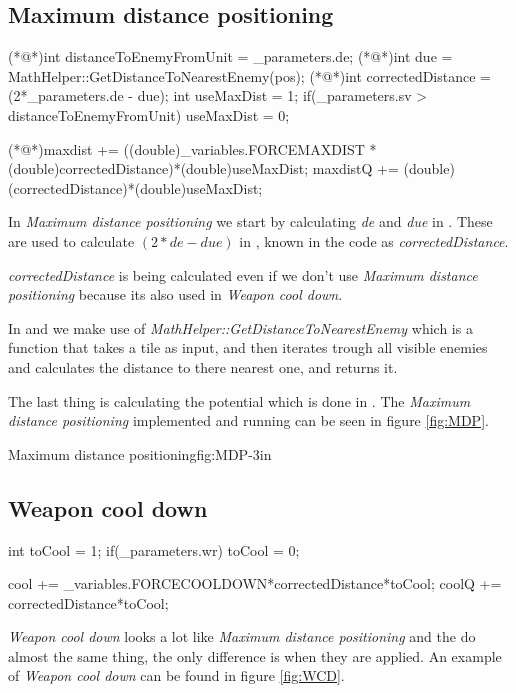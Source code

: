 	\subsection{Maximum distance positioning}
		\begin{Sourcecode}[caption=Maximum distance]
(*@\lnote@*)int distanceToEnemyFromUnit = _parameters.de;
(*@\lnote@*)int due = MathHelper::GetDistanceToNearestEnemy(pos);
(*@\lnote@*)int correctedDistance = (2*_parameters.de - due);
int useMaxDist = 1;
if(_parameters.sv > distanceToEnemyFromUnit)
	useMaxDist = 0;

(*@\lnote@*)maxdist += ((double)_variables.FORCEMAXDIST * (double)correctedDistance)*(double)useMaxDist;
maxdistQ += (double)(correctedDistance)*(double)useMaxDist;
\end{Sourcecode}
	
	In \textit{Maximum distance positioning} we start by calculating \textit{de} and \textit{due }in  . These are used to calculate $(2*de - due)$ in , known in the code as \textit{correctedDistance}. 
	
	\textit{correctedDistance} is being calculated even if we don't use \textit{Maximum distance positioning} because its also used in \textit{Weapon cool down}. 
	
	In  and  we make use of \textit{MathHelper::GetDistanceToNearestEnemy} which is a function that takes a tile as input, and then iterates trough all visible enemies and calculates the distance to there nearest one, and returns it.
	
	The last thing is calculating the potential which is done in . The \textit{Maximum distance positioning} implemented and running can be seen in figure \ref{fig:MDP}.

	
			{Maximum distance positioning}{fig:MDP}{-3in}

	\subsection{Weapon cool down}
		\begin{Sourcecode}[caption=Weapon cool down]
int toCool = 1;
if(_parameters.wr)
	toCool = 0;
	
cool += _variables.FORCECOOLDOWN*correctedDistance*toCool;
coolQ += correctedDistance*toCool;
\end{Sourcecode}	
	\textit{Weapon cool down} looks a lot like \textit{Maximum distance positioning} and the do almost the same thing, the only difference is when they are applied. An example of \textit{Weapon cool down} can be found in figure \ref{fig:WCD}.
	

